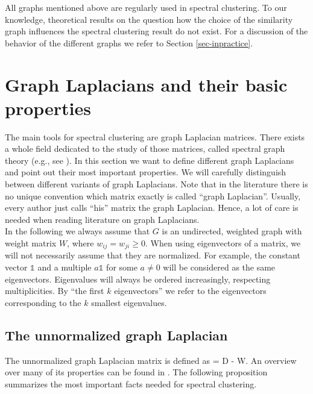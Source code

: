 \documentclass{article}
\def\ba#1\ea{\begin{align*}#1\end{align*}} %
\newcommand{\charfct}{\mathbb{1}}
\newcommand{\Lun}{L}
\begin{document}
All graphs mentioned above are regularly used in spectral
clustering. To our knowledge, theoretical results on the question how
the choice of the similarity graph influences the spectral clustering
result do not exist. For a discussion of the behavior of
the different graphs we refer to Section \ref{sec-inpractice}.\\




%
\section{Graph Laplacians and their basic properties} \label{sec-laplacians}
%

The main tools for spectral clustering are graph Laplacian
matrices.  There exists a whole field dedicated to the study of those
matrices, called spectral graph theory (e.g., see ). In
this section we want to define different graph Laplacians and point
out their most important properties. We will carefully distinguish
between different variants of graph Laplacians. Note that in the
literature there is no  unique convention which matrix exactly is
called ``graph Laplacian''. 
Usually, every author just calls ``his'' matrix the graph
Laplacian. Hence, a lot of care is needed when reading literature on
graph Laplacians.\\
%

In the following we always assume that $G$ is an undirected, weighted
graph with weight matrix $W$, where $w_{ij} = w_{ji} \geq 0$. When
using eigenvectors  of a matrix, we will not necessarily assume that
they are normalized. For example, the constant vector
$\charfct$ and a multiple $a \charfct$ for some $a \neq 0$ will be
considered as the same eigenvectors. Eigenvalues will always be
ordered increasingly, respecting multiplicities. By ``the first $k$
eigenvectors'' we refer to the eigenvectors corresponding to the $k$
smallest eigenvalues. 

%
\subsection{The unnormalized graph Laplacian} \label{ssec-lun}
%

The unnormalized graph Laplacian matrix is defined as
\ba
\Lun = D - W.
\ea
%
An overview over many of its
properties can be found in .  The following
proposition summarizes the most important facts needed for spectral
clustering.
\end{document}
